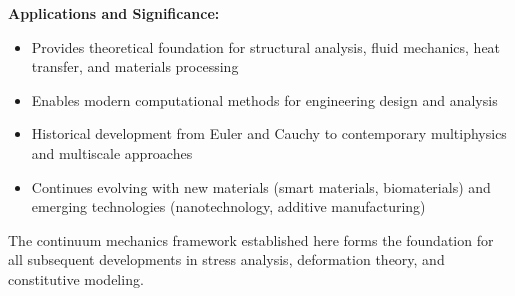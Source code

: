 \begin{subox}[Summary]
\textbf{Applications and Significance:}
\begin{itemize}
\item Provides theoretical foundation for structural analysis, fluid mechanics, heat transfer, and materials processing
\item Enables modern computational methods for engineering design and analysis
\item Historical development from Euler and Cauchy to contemporary multiphysics and multiscale approaches
\item Continues evolving with new materials (smart materials, biomaterials) and emerging technologies (nanotechnology, additive manufacturing)
\end{itemize}

The continuum mechanics framework established here forms the foundation for all subsequent developments in stress analysis, deformation theory, and constitutive modeling.
\end{subox}